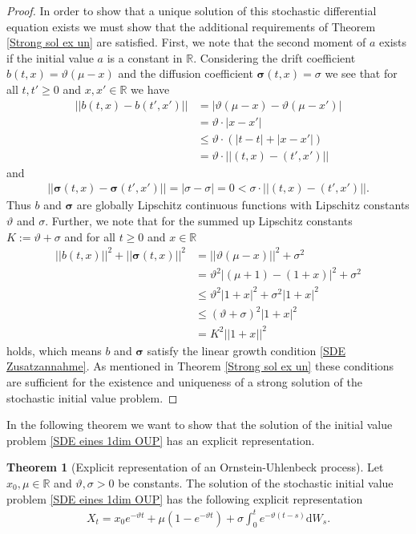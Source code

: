 \documentclass[11pt,titlepage]{article}
\newcommand{\R}{\mathbb{R}} %
\newcommand{\abs}[1]{{\left| #1 \right|}}
\theoremstyle{definition}
\newtheorem{theorem}{Theorem}[section]
\theoremstyle{remark}
\begin{document}
	\begin{proof}
		In order to show that a unique solution of this stochastic differential equation exists 
		we must show that the additional requirements of Theorem \ref{Strong sol ex un} are satisfied.
		First, we note that the second moment 
		of $a$ exists if the initial value $a$ is a constant in $\R$. Considering the drift coefficient $b(t,x)= \vartheta(\mu-x)$ and the diffusion coefficient $\boldsymbol{\sigma}(t, x) = \sigma$ we see that 
		for all $t, t'\geq 0$ and $x, x'\in\R$ we have
		\begin{align*}
			\abs{\abs{b(t, x) -b(t',x')}} &= \abs{\vartheta(\mu-x) -\vartheta(\mu-x')}\\
			&= \vartheta\cdot \abs{x - x'} \\
			&\leq \vartheta \cdot(\abs{t-t} + \abs{x-x'})\\
			&= \vartheta\cdot \abs{\abs{(t, x) - (t',x')}}
		\end{align*}
		and 
		\begin{align*}
			\abs{\abs{\boldsymbol{\sigma}(t, x) -\boldsymbol{\sigma}(t',x')}} = \abs{\sigma - \sigma} = 0 < \sigma\cdot \abs{\abs{(t, x) - (t',x')}}.
		\end{align*}
		Thus $b$ and $\boldsymbol{\sigma}$ are globally Lipschitz continuous functions with 
		Lipschitz constants $\vartheta$ and $\sigma$. Further, we note that 
		for the summed up Lipschitz constants $K:=\vartheta+\sigma$ and for all $t\geq 0$ and $x\in\R$
		\begin{align*}
			\abs{\abs{b(t,x)}}^2 + \abs{\abs{\boldsymbol{\sigma}(t,x)}}^2 &= \abs{\abs{\vartheta(\mu -x)}}^2 + \sigma^2 \\
			&= \vartheta^2 \abs{(\mu + 1) - (1+x)}^2 + \sigma^2 \\
			&\leq \vartheta^2 \abs{1+x}^2 + \sigma^2 \abs{1+x}^2 \\
			&\leq (\vartheta + \sigma)^2 \abs{1+x}^2\\
			&= K^2 \abs{\abs{1+x}}^2
		\end{align*}
		holds, which means $b$ and $\boldsymbol{\sigma}$ satisfy the linear growth condition \ref{SDE Zusatzannahme}. As mentioned in Theorem \ref{Strong sol ex un} these conditions are sufficient for the existence and uniqueness of a strong  
		solution of the stochastic initial value problem.
	\end{proof}
	
	In the following theorem we want to show that the solution of the initial value problem \ref{SDE eines 1dim OUP} has an explicit representation.
	\begin{theorem}[Explicit representation of an Ornstein-Uhlenbeck process]
		Let $x_0,\mu\in\R$ and $\vartheta,\sigma>0$ be constants. The solution of the stochastic initial value problem \ref{SDE eines 1dim OUP} has the following explicit representation
		\begin{align} \label{1dim expl repr OUP}
			X_t = x_0 e^{-\vartheta t}+\mu(1-e^{-\vartheta t})+\sigma \int_0^t e^{-\vartheta (t-s)}\mathrm{d}W_s.
		\end{align}
	\end{theorem}
	
\end{document}
